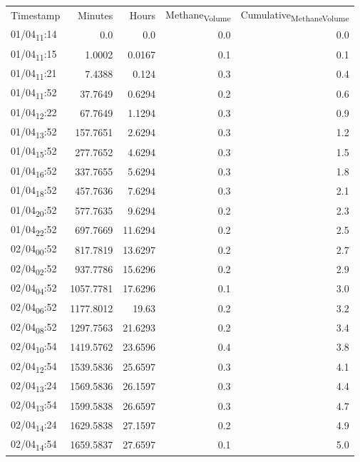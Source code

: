 \documentclass[11pt]{article}
\begin{document}
\begin{center}
\begin{tabular}{lrrrr}
Timestamp & Minutes & Hours & Methane\textsubscript{Volume} & Cumulative\textsubscript{Methane}\textsubscript{Volume}\\[0pt]
01/04\textsubscript{11}:14 & 0.0 & 0.0 & 0.0 & 0.0\\[0pt]
01/04\textsubscript{11}:15 & 1.0002 & 0.0167 & 0.1 & 0.1\\[0pt]
01/04\textsubscript{11}:21 & 7.4388 & 0.124 & 0.3 & 0.4\\[0pt]
01/04\textsubscript{11}:52 & 37.7649 & 0.6294 & 0.2 & 0.6\\[0pt]
01/04\textsubscript{12}:22 & 67.7649 & 1.1294 & 0.3 & 0.9\\[0pt]
01/04\textsubscript{13}:52 & 157.7651 & 2.6294 & 0.3 & 1.2\\[0pt]
01/04\textsubscript{15}:52 & 277.7652 & 4.6294 & 0.3 & 1.5\\[0pt]
01/04\textsubscript{16}:52 & 337.7655 & 5.6294 & 0.3 & 1.8\\[0pt]
01/04\textsubscript{18}:52 & 457.7636 & 7.6294 & 0.3 & 2.1\\[0pt]
01/04\textsubscript{20}:52 & 577.7635 & 9.6294 & 0.2 & 2.3\\[0pt]
01/04\textsubscript{22}:52 & 697.7669 & 11.6294 & 0.2 & 2.5\\[0pt]
02/04\textsubscript{00}:52 & 817.7819 & 13.6297 & 0.2 & 2.7\\[0pt]
02/04\textsubscript{02}:52 & 937.7786 & 15.6296 & 0.2 & 2.9\\[0pt]
02/04\textsubscript{04}:52 & 1057.7781 & 17.6296 & 0.1 & 3.0\\[0pt]
02/04\textsubscript{06}:52 & 1177.8012 & 19.63 & 0.2 & 3.2\\[0pt]
02/04\textsubscript{08}:52 & 1297.7563 & 21.6293 & 0.2 & 3.4\\[0pt]
02/04\textsubscript{10}:54 & 1419.5762 & 23.6596 & 0.4 & 3.8\\[0pt]
02/04\textsubscript{12}:54 & 1539.5836 & 25.6597 & 0.3 & 4.1\\[0pt]
02/04\textsubscript{13}:24 & 1569.5836 & 26.1597 & 0.3 & 4.4\\[0pt]
02/04\textsubscript{13}:54 & 1599.5838 & 26.6597 & 0.3 & 4.7\\[0pt]
02/04\textsubscript{14}:24 & 1629.5838 & 27.1597 & 0.2 & 4.9\\[0pt]
02/04\textsubscript{14}:54 & 1659.5837 & 27.6597 & 0.1 & 5.0\\[0pt]

\end{tabular}
\end{center}
\end{document}
